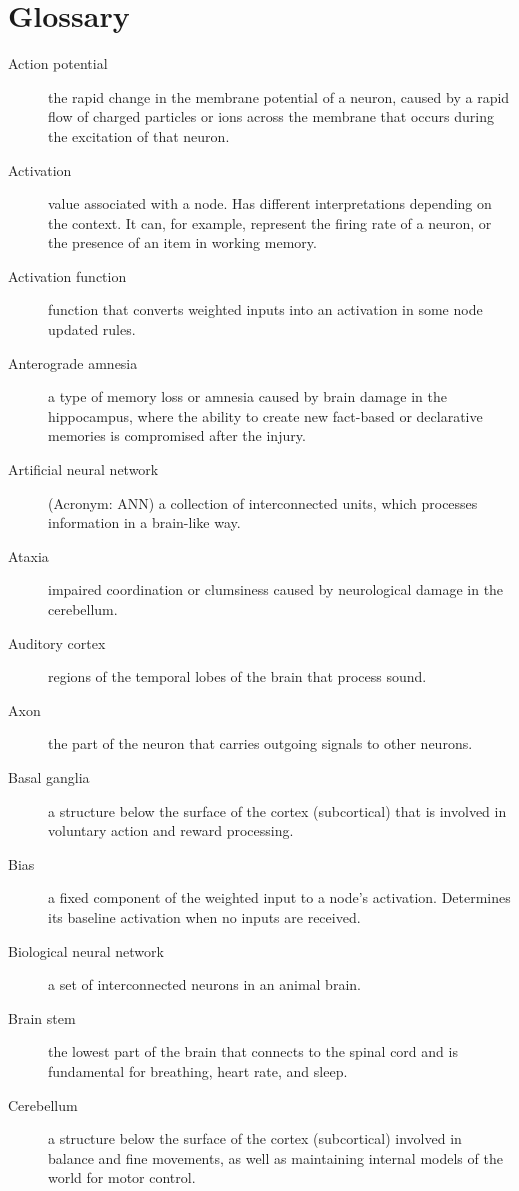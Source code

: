 \chapter*{Glossary}
\begin{description}

\item[Action potential] the rapid change in the membrane potential of a neuron, caused by a rapid flow of charged particles or ions across the membrane that occurs during the excitation of that neuron.
\item[Activation] value associated with a node. Has different interpretations depending on the context. It can, for example, represent the firing rate of a neuron, or the presence of an item in working memory.
\item[Activation function] function that converts weighted inputs into an activation in some node updated rules.
\item[Anterograde amnesia] a type of memory loss or amnesia caused by brain damage in the hippocampus, where the ability to create new fact-based or declarative memories is compromised after the injury. 
\item[Artificial neural network] (Acronym: ANN) a collection of interconnected units, which processes information in a brain-like way.
\item[Ataxia] impaired coordination or clumsiness caused by neurological damage in the cerebellum.
\item[Auditory cortex] regions of the temporal lobes of the brain that process sound. 
\item[Axon] the part of the neuron that carries outgoing signals to other neurons.
\item[Basal ganglia] a structure below the surface of the cortex (subcortical) that is involved in voluntary action and reward processing.
\item[Bias] a fixed component of the weighted input to a node's activation. Determines its baseline activation when no inputs are received.
\item[Biological neural network] a set of interconnected neurons in an animal brain.
\item[Brain stem] the lowest part of the brain that connects to the spinal cord and is fundamental for breathing, heart rate, and sleep.
\item[Cerebellum] a structure below the surface of the cortex (subcortical) involved in balance and fine movements, as well as maintaining internal models of the world for motor control.

\end{description}
